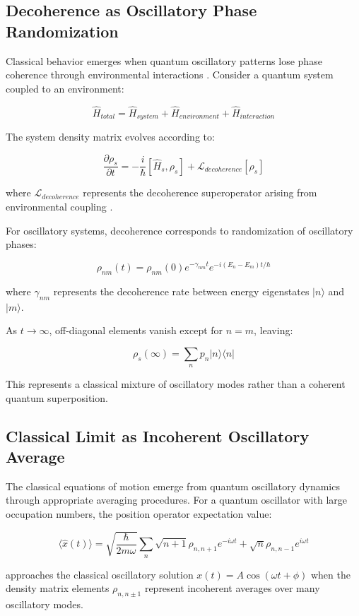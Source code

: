 \documentclass[11pt]{article}
\theoremstyle{remark}
\begin{document}
\subsection{Decoherence as Oscillatory Phase Randomization}

Classical behavior emerges when quantum oscillatory patterns lose phase coherence through environmental interactions \cite{zurek2003decoherence,schlosshauer2007decoherence}. Consider a quantum system coupled to an environment:

$$\hat{H}_{total} = \hat{H}_{system} + \hat{H}_{environment} + \hat{H}_{interaction}$$

The system density matrix evolves according to:

$$\frac{\partial \rho_s}{\partial t} = -\frac{i}{\hbar}[\hat{H}_s, \rho_s] + \mathcal{L}_{decoherence}[\rho_s]$$

where $\mathcal{L}_{decoherence}$ represents the decoherence superoperator arising from environmental coupling \cite{zurek2003decoherence}.

For oscillatory systems, decoherence corresponds to randomization of oscillatory phases:

$$\rho_{nm}(t) = \rho_{nm}(0) e^{-\gamma_{nm} t} e^{-i(E_n - E_m)t/\hbar}$$

where $\gamma_{nm}$ represents the decoherence rate between energy eigenstates $|n\rangle$ and $|m\rangle$.

As $t \to \infty$, off-diagonal elements vanish except for $n = m$, leaving:

$$\rho_s(\infty) = \sum_n p_n |n\rangle\langle n|$$

This represents a classical mixture of oscillatory modes rather than a coherent quantum superposition.

\subsection{Classical Limit as Incoherent Oscillatory Average}

The classical equations of motion emerge from quantum oscillatory dynamics through appropriate averaging procedures. For a quantum oscillator with large occupation numbers, the position operator expectation value:

$$\langle \hat{x}(t)\rangle = \sqrt{\frac{\hbar}{2m\omega}} \sum_n \sqrt{n+1} \rho_{n,n+1} e^{-i\omega t} + \sqrt{n} \rho_{n,n-1} e^{i\omega t}$$

approaches the classical oscillatory solution $x(t) = A\cos(\omega t + \phi)$ when the density matrix elements $\rho_{n,n±1}$ represent incoherent averages over many oscillatory modes.
\end{document}
